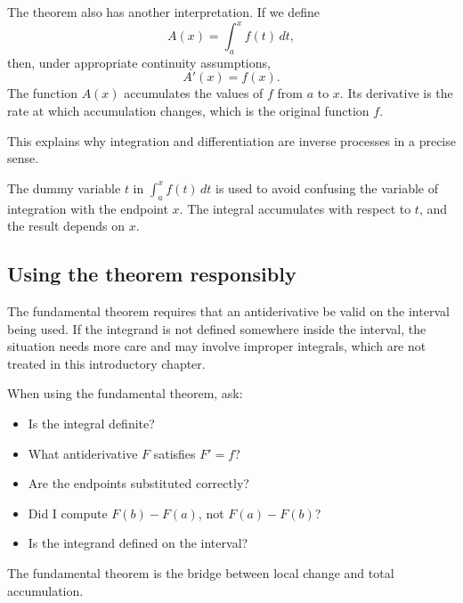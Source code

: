 The theorem also has another interpretation. If we define
\[
A(x)=\int_a^x f(t)\,dt,
\]
then, under appropriate continuity assumptions,
\[
A'(x)=f(x).
\]
The function \(A(x)\) accumulates the values of \(f\) from \(a\) to \(x\). Its derivative is the rate at which accumulation changes, which is the original function \(f\).

This explains why integration and differentiation are inverse processes in a precise sense.

\begin{remarkbox}
The dummy variable \(t\) in \(\int_a^x f(t)\,dt\) is used to avoid confusing the variable of integration with the endpoint \(x\). The integral accumulates with respect to \(t\), and the result depends on \(x\).
\end{remarkbox}

\subsection*{Using the theorem responsibly}

The fundamental theorem requires that an antiderivative be valid on the interval being used. If the integrand is not defined somewhere inside the interval, the situation needs more care and may involve improper integrals, which are not treated in this introductory chapter.

\begin{summarybox}
When using the fundamental theorem, ask:
\begin{itemize}
\item Is the integral definite?
\item What antiderivative \(F\) satisfies \(F'=f\)?
\item Are the endpoints substituted correctly?
\item Did I compute \(F(b)-F(a)\), not \(F(a)-F(b)\)?
\item Is the integrand defined on the interval?
\end{itemize}
\end{summarybox}

The fundamental theorem is the bridge between local change and total accumulation.